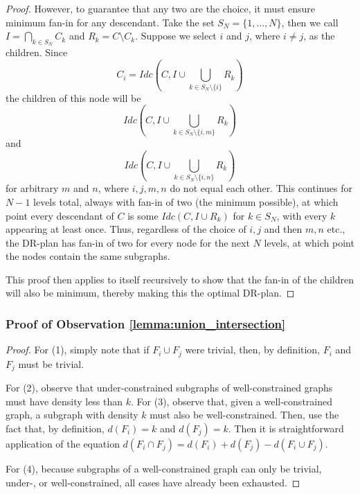 \begin{proof}
However, to guarantee that any two are the  choice, it must ensure minimum fan-in for any descendant. Take the set $S_N=\{1,\dots,N\}$, then we call $I=\bigcap_{k\in S_N}{C_k}$ and $R_k=C\setminus C_k$. Suppose we select $i$ and $j$, where $i\neq j$, as the children. Since
\[C_i=Idc\left(C,I\cup\bigcup_{k\in S_N\setminus\{i\}}{R_k}\right)\]
the children of this node will be
\[Idc\left(C,I\cup\bigcup_{k\in S_N\setminus\{i,m\}}{R_k}\right)\]
and
\[Idc\left(C,I\cup\bigcup_{k\in S_N\setminus\{i,n\}}{R_k}\right)\]
for arbitrary $m$ and $n$, where $i,j,m,n$ do not equal each other.  This continues for $N-1$ levels total, always with fan-in of two (the minimum possible), at which point every descendant of $C$ is some $Idc(C,I\cup R_k)$ for $k\in S_N$, with every $k$ appearing at least once. Thus, regardless of the choice of $i,j$ and then $m,n$ etc., the DR-plan has fan-in of two for every node for the next $N$ levels, at which point the nodes contain the same subgraphs.

This proof then applies to itself recursively to show that the fan-in of the children will also be minimum, thereby making this the optimal DR-plan.
\end{proof}


\subsubsection{Proof of Observation \ref{lemma:union_intersection}}

\begin{proof}
For (1), simply note that if $F_i\cup F_j$ were trivial, then, by definition, $F_i$ and $F_j$ must be trivial.

For (2), observe that under-constrained subgraphs of well-constrained graphs must have density less than $k$. For (3), observe that, given a well-constrained graph, a subgraph with density $k$ must also be well-constrained. Then, use the fact that, by definition, $d(F_i)=k$ and $d(F_j)=k$. Then it is straightforward application of the equation $d(F_i\cap F_j)=d(F_i)+d(F_j)-d(F_i\cup F_j)$.

For (4), because subgraphs of a well-constrained graph can only be trivial, under-, or well-constrained, all cases have already been exhausted.
\end{proof}


